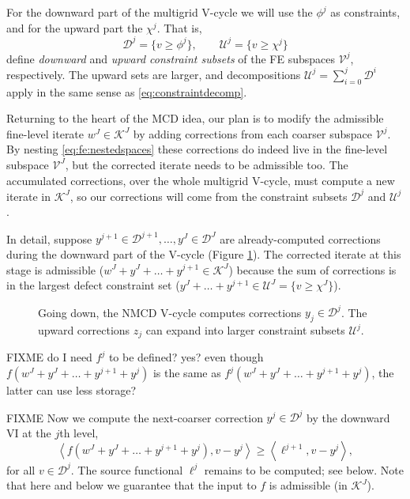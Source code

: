 \documentclass[letterpaper,final,12pt,reqno]{amsart}
\theoremstyle{cstyle}
\theoremstyle{cstyle*}
\theoremstyle{dstyle}
\numberwithin{equation}{section}
\numberwithin{figure}{section}
\numberwithin{table}{section}
\numberwithin{theorem}{section}
\newcommand{\ip}[2]{\left<#1,#2\right>}
\begin{document}
For the downward part of the multigrid V-cycle we will use the $\phi^j$ as constraints, and for the upward part the $\chi^j$.  That is,
\begin{equation}
\mathcal{D}^j = \{v\ge \phi^j\}, \qquad \mathcal{U}^j = \{v\ge \chi^j\} \label{eq:fe:constraintsets}
\end{equation}
define \emph{downward} and \emph{upward constraint subsets} of the FE subspaces $\mathcal{V}^j$, respectively.  The upward sets are larger, and decompositions $\mathcal{U}^j = \sum_{i=0}^j \mathcal{D}^i$ apply in the same sense as \eqref{eq:constraintdecomp}.

Returning to the heart of the MCD idea, our plan is to modify the admissible fine-level iterate $w^J\in \mathcal{K}^J$ by adding corrections from each coarser subspace $\mathcal{V}^j$.  By nesting \eqref{eq:fe:nestedspaces} these corrections do indeed live in the fine-level subspace $\mathcal{V}^J$, but the corrected iterate needs to be admissible too.  The accumulated corrections, over the whole multigrid V-cycle, must compute a new iterate in $\mathcal{K}^J$, so our corrections will come from the constraint subsets $\mathcal{D}^j$ and $\mathcal{U}^j$.

In detail, suppose $y^{j+1} \in \mathcal{D}^{j+1}, \dots, y^J \in \mathcal{D}^J$ are already-computed corrections during the downward part of the V-cycle (Figure \ref{fig:nmcdvcycle}).  The corrected iterate at this stage is admissible ($w^J + y^J + \dots + y^{j+1} \in \mathcal{K}^J$) because the sum of corrections is in the largest defect constraint set ($y^J + \dots + y^{j+1} \in \mathcal{U}^J = \{v\ge \chi^J\}$).

\begin{figure}[h]
\begin{center}

\end{center}
\caption{Going down, the NMCD V-cycle computes corrections $y_j \in \mathcal{D}^j$.  The upward corrections $z_j$ can expand into larger constraint subsets $\mathcal{U}^j$.}
\label{fig:nmcdvcycle}
\end{figure}

FIXME do I need $f^j$ to be defined?  yes?  even though $f(w^J+y^J + \dots + y^{j+1} +y^j)$ is the same as $f^j(w^J+y^J + \dots + y^{j+1} +y^j)$, the latter can use less storage?

FIXME Now we compute the next-coarser correction $y^j \in \mathcal{D}^j$ by the downward VI at the $j$th level,
\begin{equation}
\ip{f(w^J+y^J + \dots + y^{j+1} +y^j)}{v-y^j} \ge \ip{\ell^{j+1}}{v-y^j}, \label{eq:fe:levelvi}
\end{equation}
for all $v \in \mathcal{D}^j$.  The source functional $\ell^j$ remains to be computed; see below.  Note that here and below we guarantee that the input to $f$ is admissible (in $\mathcal{K}^J$).
\end{document}
